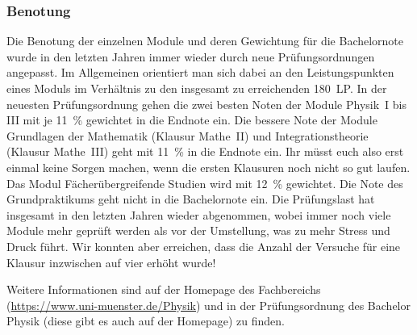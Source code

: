 \begin{multicols}{2}
\subsubsection*{Benotung}
Die Benotung der einzelnen Module und deren Gewichtung für die Bachelornote wurde in den letzten Jahren immer wieder durch neue Prüfungsordnungen angepasst. Im Allgemeinen orientiert man sich dabei an den Leistungspunkten eines Moduls im Verhältnis zu den insgesamt zu erreichenden \SI{180}{LP}. In der neuesten Prüfungsordnung gehen die zwei besten Noten der Module Physik~I bis III mit je \SI{11}{\percent} gewichtet in die Endnote ein. Die bessere Note der Module Grundlagen der Mathematik (Klausur Mathe~II) und Integrationstheorie (Klausur Mathe~III) geht mit \SI{11}{\percent} in die Endnote ein. Ihr müsst euch also erst einmal keine Sorgen machen, wenn die ersten Klausuren noch nicht so gut laufen. Das Modul Fächerübergreifende Studien wird mit \SI{12}{\percent} gewichtet. Die Note des Grundpraktikums geht nicht in die Bachelornote ein. Die Prüfungslast hat insgesamt in den letzten Jahren wieder abgenommen, wobei immer noch viele Module mehr geprüft werden als vor der Umstellung, was zu mehr Stress und Druck führt. Wir konnten aber erreichen, dass die Anzahl der Versuche für eine Klausur inzwischen auf vier erhöht wurde!

Weitere Informationen sind auf der Homepage des Fachbereichs (\url{https://www.uni-muenster.de/Physik}) und in der Prüfungsordnung des Bachelor Physik (diese gibt es auch auf der Homepage) zu finden.

\end{multicols}
